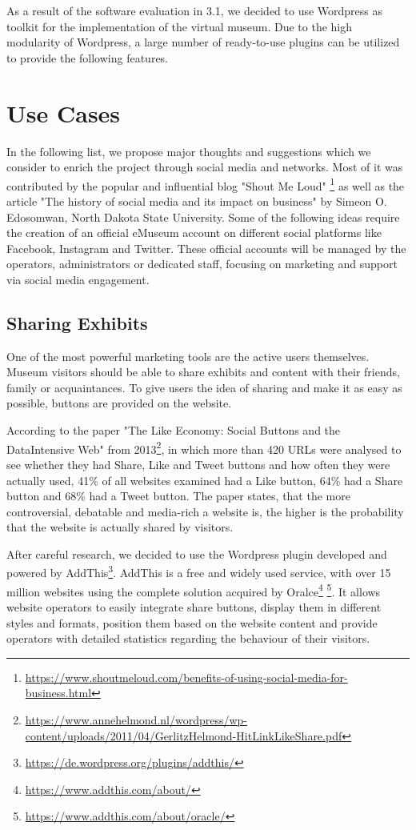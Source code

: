 As a result of the software evaluation in 3.1, we decided to use Wordpress as toolkit for the implementation of the virtual museum. Due to the high modularity of Wordpress, a large number of ready-to-use plugins can be utilized to provide the following features.


\section{Use Cases}
In the following list, we propose major thoughts and suggestions which we consider to enrich the project through social media and networks. Most of it was contributed by the popular and influential blog "Shout Me Loud" \footnote{\url{https://www.shoutmeloud.com/benefits-of-using-social-media-for-business.html}} as well as the article "The history of social media and its impact on business"  by Simeon O. Edosomwan, North Dakota State University. Some of the following ideas require the creation of an official eMuseum account on different social platforms like Facebook, Instagram and Twitter. These official accounts will be managed by the operators, administrators or dedicated staff, focusing on marketing and support via social media engagement.


\subsection{Sharing Exhibits} \label{social_sharing}

One of the most powerful marketing tools are the active users themselves. Museum visitors should be able to share exhibits and content with their friends, family or acquaintances. To give users the idea of sharing and make it as easy as possible, buttons are provided on the website.

According to the paper "The Like Economy: Social Buttons and the DataIntensive Web" from 2013\footnote{\url{https://www.annehelmond.nl/wordpress/wp-content/uploads/2011/04/GerlitzHelmond-HitLinkLikeShare.pdf}}, in which more than 420 URLs were analysed to see whether they had Share, Like and Tweet buttons and how often they were actually used, 41\% of all websites examined had a Like button, 64\% had a Share button and 68\% had a Tweet button. The paper states, that the more controversial, debatable and media-rich a website is, the higher is the probability that the website is actually shared by visitors.

After careful research, we decided to use the Wordpress plugin developed and powered by AddThis\footnote{\url{https://de.wordpress.org/plugins/addthis/}}. AddThis is a free and widely used service, with over 15 million websites using the complete solution acquired by Oralce\footnote{\url{https://www.addthis.com/about/}} \footnote{\url{https://www.addthis.com/about/oracle/}}. It allows website operators to easily integrate share buttons, display them in different styles and formats, position them based on the website content and provide operators with detailed statistics regarding the behaviour of their visitors.


